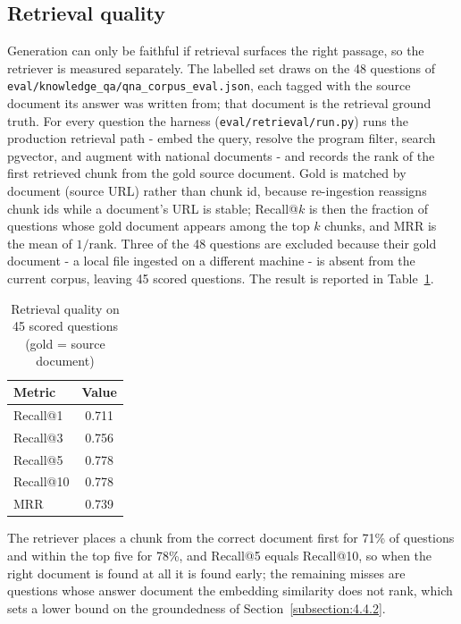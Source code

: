 \documentclass[../main.tex]{subfiles}
\begin{document}
\subsection{Retrieval quality}
\label{subsection:4.4.3}

Generation can only be faithful if retrieval surfaces the right passage, so the retriever is measured separately.
The labelled set draws on the 48 questions of \texttt{eval/knowledge\_qa/qna\_corpus\_eval.json}, each tagged with the source document its answer was written from; that document is the retrieval ground truth.
For every question the harness (\texttt{eval/retrieval/run.py}) runs the production retrieval path - embed the query, resolve the program filter, search pgvector, and augment with national documents - and records the rank of the first retrieved chunk from the gold source document.
Gold is matched by document (source URL) rather than chunk id, because re-ingestion reassigns chunk ids while a document's URL is stable; Recall@$k$ is then the fraction of questions whose gold document appears among the top $k$ chunks, and \gls{MRR} is the mean of $1/\text{rank}$.
Three of the 48 questions are excluded because their gold document - a local file ingested on a different machine - is absent from the current corpus, leaving 45 scored questions.
The result is reported in Table~\ref{table:eval-retrieval}.
\begin{table}[H]
    \centering
    \caption{Retrieval quality on 45 scored questions (gold = source document)}
    \label{table:eval-retrieval}
    \begin{tabular}{|p{7.5cm}|c|}
        \hline
        \textbf{Metric} & \textbf{Value} \\
        \hline
        Recall@1 & 0.711 \\
        \hline
        Recall@3 & 0.756 \\
        \hline
        Recall@5 & 0.778 \\
        \hline
        Recall@10 & 0.778 \\
        \hline
        MRR & 0.739 \\
        \hline
    \end{tabular}
\end{table}

The retriever places a chunk from the correct document first for 71\% of questions and within the top five for 78\%, and Recall@5 equals Recall@10, so when the right document is found at all it is found early; the remaining misses are questions whose answer document the embedding similarity does not rank, which sets a lower bound on the groundedness of Section~\ref{subsection:4.4.2}.
\end{document}
